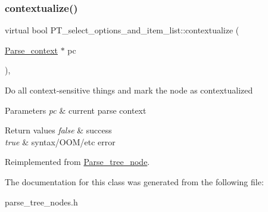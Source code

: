 \subsubsection{\texorpdfstring{contextualize()}{contextualize()}}
{\footnotesize\ttfamily virtual bool P\+T\+\_\+select\+\_\+options\+\_\+and\+\_\+item\+\_\+list\+::contextualize (\begin{DoxyParamCaption}\item[{\mbox{\hyperlink{structParse__context}{Parse\+\_\+context}} $\ast$}]{pc }\end{DoxyParamCaption})\hspace{0.3cm}{\ttfamily [inline]}, {\ttfamily [virtual]}}

Do all context-\/sensitive things and mark the node as contextualized


\begin{DoxyParams}{Parameters}
{\em pc} & current parse context\\
\hline
\end{DoxyParams}

\begin{DoxyRetVals}{Return values}
{\em false} & success \\
\hline
{\em true} & syntax/\+O\+O\+M/etc error \\
\hline
\end{DoxyRetVals}


Reimplemented from \mbox{\hyperlink{classParse__tree__node_a22d93524a537d0df652d7efa144f23da}{Parse\+\_\+tree\+\_\+node}}.



The documentation for this class was generated from the following file\+:\begin{DoxyCompactItemize}
\item 
parse\+\_\+tree\+\_\+nodes.\+h\end{DoxyCompactItemize}
